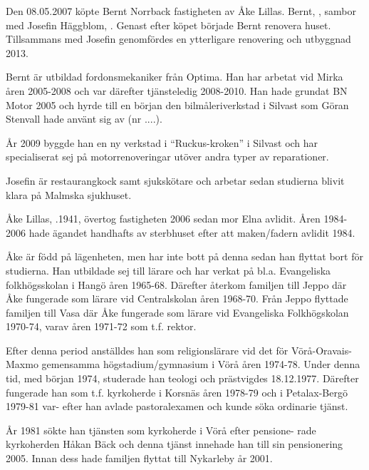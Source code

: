 Den 08.05.2007 köpte Bernt Norrback fastigheten av Åke Lillas. Bernt, ,  sambor med Josefin Häggblom, . Genast efter köpet började Bernt renovera huset. Tillsammans med Josefin genomfördes en ytterligare renovering och utbyggnad 2013.



Bernt är utbildad fordonsmekaniker från Optima. Han har arbetat vid Mirka åren 2005-2008 och var därefter tjänsteledig 2008-2010. Han hade grundat BN Motor 2005 och hyrde till en början den bilmåleriverkstad i Silvast som Göran Stenvall hade använt sig av (nr ....).

År 2009 byggde han en ny verkstad i ``Ruckus-kroken'' i Silvast och har specialiserat sej på motorrenoveringar utöver andra typer av 	reparationer.

Josefin är restaurangkock samt sjukskötare och arbetar sedan studierna blivit klara på Malmska sjukhuset.
\begin{jhchildren}
  \item {}
  \item {}
\end{jhchildren}



Åke Lillas, .1941, övertog fastigheten 2006 sedan mor Elna avlidit. Åren 1984-2006 hade ägandet handhafts av sterbhuset efter	att maken/fadern avlidit 1984.

Åke är född på lägenheten, men har inte bott på denna sedan han	flyttat bort för studierna. Han utbildade sej till lärare och har verkat	på bl.a. Evangeliska folkhögsskolan i Hangö åren 1965-68. Därefter	återkom familjen till Jeppo där Åke fungerade som lärare vid Centralskolan åren 1968-70. Från Jeppo flyttade familjen till Vasa där Åke 	fungerade som lärare vid Evangeliska Folkhögskolan 1970-74, varav	åren 1971-72 som t.f. rektor.

Efter denna period anställdes han som religionslärare vid det för	Vörå-Oravais-Maxmo gemensamma högstadium/gymnasium i Vörå	åren 1974-78. Under denna tid, med början 1974, studerade han	teologi och prästvigdes 18.12.1977. Därefter fungerade han som t.f.	kyrkoherde i Korsnäs åren 1978-79 och i Petalax-Bergö 1979-81 var-	efter han avlade pastoralexamen och kunde söka ordinarie tjänst.

År 1981 sökte han tjänsten som kyrkoherde i Vörå efter pensione-	rade kyrkoherden Håkan Bäck och denna tjänst innehade han till sin 	pensionering 2005. Innan dess hade familjen flyttat till Nykarleby år 2001.


